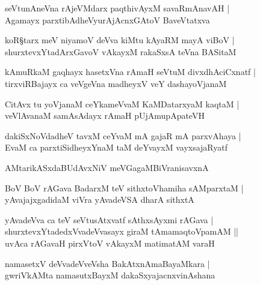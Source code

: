 \begin{shloka}
seVtunAneVna rAjeVMdarx paqthivAyxM savaRmAnavAH |\\
Agamayx parxtibAdheVyurAjAcnxGAtoV BaveVtatxva 
\end{shloka}

\begin{shloka}
koR\S tarx meV niyamoV deVva kiMtu kAyaRM mayA viBoV |\\
shurxtevxYtadArxGavoV vAkayxM rakaSxsA teVna BASitaM 
\end{shloka}

\begin{shloka}
kAmuRkaM gaqhayx hasetxVna rAmaH seVtuM divxdhAciCxnatf |\\
tirxviRBajayx ca veVgeVna madheyxV veY dashayoVjanaM 
\end{shloka}

\begin{shloka}
CitAvx tu yoVjanaM ceYkameVvaM KaMDatarxyaM kaqtaM |\\
veVlAvanaM samAsAdayx rAmaH pUjAmupApateVH 
\end{shloka}

\begin{shloka}
dakiSxNoVdadheV tavxM ceYvaM mA gajaR mA parxvAhaya |\\
EvaM ca parxtiSidheyxYnaM taM deYvayxM vayxsajaRyatf 
\end{shloka}

\begin{shloka}
AMtarikASxdaBUdAvxNiV meVGagaMBiVranisavxnA 
\end{shloka}

\begin{shloka}
BoV BoV rAGava BadarxM teV sithxtoVhamiha sAMparxtaM |\\
yAvajajxgadidaM viVra yAvadeVSA dharA sithxtA
\end{shloka}

\begin{shloka}
yAvadeVva ca teV seVtusAtxvatf sAthxsAyxmi rAGava |\\
shurxtevxYtadedxVvadeVvasayx giraM tAmamaqtoVpamAM ||\\
uvAca rAGavaH pirxVtoV vAkayxM matimatAM varaH 
\end{shloka}

\begin{shloka}
namasetxV deVvadeVveVsha BakAtxnAmaBayaMkara |\\
gwriVkAMta namasutxBayxM dakaSxyajacnxvinAshana
\end{shloka}

